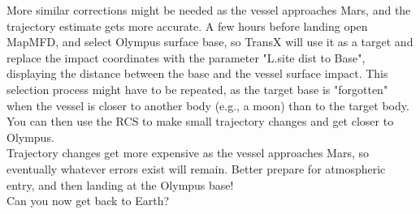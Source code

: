 \documentclass[Orbiter User Manual.tex]{subfiles}
\begin{document}
More similar corrections might be needed as the vessel approaches Mars, and the trajectory estimate gets more accurate. A few hours before landing open MapMFD, and select Olympus surface base, so TransX will use it as a target and replace the impact coordinates with the parameter "L.site dist to Base", displaying the distance between the base and the vessel surface impact. This selection process might have to be repeated, as the target base is "forgotten" when the vessel is closer to another body (e.g., a moon) than to the target body. You can then use the RCS to make small trajectory changes and get closer to Olympus.\\
Trajectory changes get more expensive as the vessel approaches Mars, so eventually whatever errors exist will remain. Better prepare for atmospheric entry, and then landing at the Olympus base!\\
Can you now get back to Earth?\\
\end{document}
